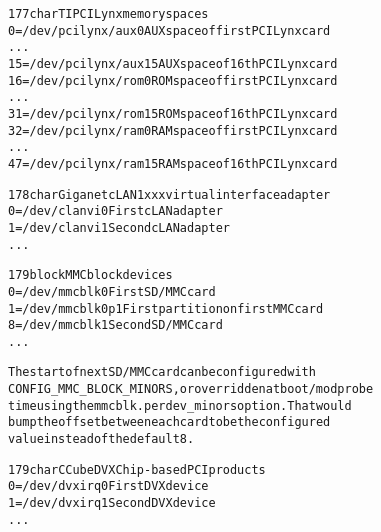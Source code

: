 \documentclass[a4paper,8pt,english]{sphinxmanual}
\begin{document}
\begin{alltt}
 177 char       TI PCILynx memory spaces
                  0 = /dev/pcilynx/aux0  AUX space of first PCILynx card
                    ...
                 15 = /dev/pcilynx/aux15 AUX space of 16th PCILynx card
                 16 = /dev/pcilynx/rom0  ROM space of first PCILynx card
                    ...
                 31 = /dev/pcilynx/rom15 ROM space of 16th PCILynx card
                 32 = /dev/pcilynx/ram0  RAM space of first PCILynx card
                    ...
                 47 = /dev/pcilynx/ram15 RAM space of 16th PCILynx card

 178 char       Giganet cLAN1xxx virtual interface adapter
                  0 = /dev/clanvi0      First cLAN adapter
                  1 = /dev/clanvi1      Second cLAN adapter
                    ...

 179 block       MMC block devices
                  0 = /dev/mmcblk0      First SD/MMC card
                  1 = /dev/mmcblk0p1    First partition on first MMC card
                  8 = /dev/mmcblk1      Second SD/MMC card
                    ...

                The start of next SD/MMC card can be configured with
                CONFIG\_MMC\_BLOCK\_MINORS, or overridden at boot/modprobe
                time using the mmcblk.perdev\_minors option. That would
                bump the offset between each card to be the configured
                value instead of the default 8.

 179 char       CCube DVXChip-based PCI products
                  0 = /dev/dvxirq0      First DVX device
                  1 = /dev/dvxirq1      Second DVX device
                    ...


\end{alltt}
\end{document}
